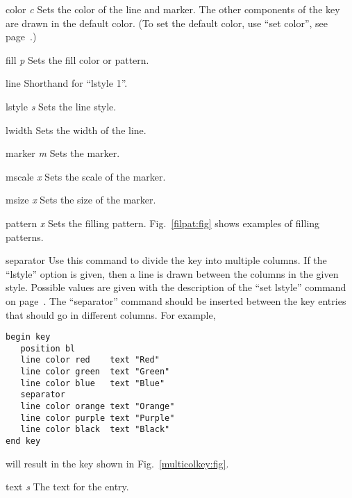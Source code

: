\begin{commanddescription}

\item[{\sf color} {\it  c}]
Sets the color of the line and marker. The other components of the key are drawn in the default color. (To set the default color, use ``set color'', see page~\pageref{scol:cmd}.)

\item[{\sf fill} {\it p}]
Sets the fill color or pattern.

\item[{\sf line}]
Shorthand for ``lstyle 1''.

\item[{\sf lstyle} {\it s}]
Sets the line style.

\item[{\sf lwidth}]
Sets the width of the line.

\item[{\sf marker} {\it m}]
Sets the marker.

\item[{\sf mscale} {\it x}]
Sets the scale of the marker.

\item[{\sf msize} {\it x}]
Sets the size of the marker.

\item[{\sf pattern} {\it x}]
Sets the filling pattern. Fig.~\ref{filpat:fig} shows examples of filling patterns.

\item[{\sf separator} {\sf [lstyle {\it s}]} ]
Use this command to divide the key into multiple columns. If the ``lstyle'' option is given, then a line is drawn between the columns in the given style. Possible values are given with the description of the ``set lstyle'' command on page~\pageref{lstyle:cmd}. The ``separator'' command should be inserted between the key entries that should go in different columns. For example,
\vspace{3mm}
\preglecode{}
\begin{Verbatim}
begin key
   position bl
   line color red    text "Red"
   line color green  text "Green" 
   line color blue   text "Blue"
   separator
   line color orange text "Orange"
   line color purple text "Purple"
   line color black  text "Black"
end key
\end{Verbatim}
\postglecode{}
\vspace{3mm}
\noindent{}will result in the key shown in Fig.~\ref{multicolkey:fig}.

\item[{\sf text} {\it s}]
The text for the entry.

\end{commanddescription}

